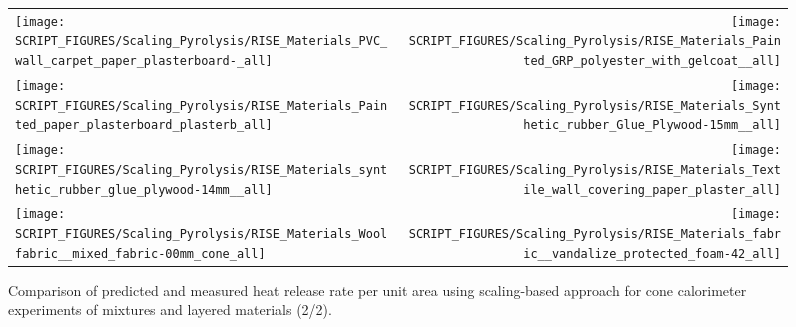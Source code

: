 \begin{figure}[!h]
\begin{tabular*}{\textwidth}{l@{\extracolsep{\fill}}r}
\texttt{[image: SCRIPT\_FIGURES/Scaling\_Pyrolysis/RISE\_Materials\_PVC\_wall\_carpet\_paper\_plasterboard-\_all]} &
\texttt{[image: SCRIPT\_FIGURES/Scaling\_Pyrolysis/RISE\_Materials\_Painted\_GRP\_polyester\_with\_gelcoat\_\_all]} \\
\texttt{[image: SCRIPT\_FIGURES/Scaling\_Pyrolysis/RISE\_Materials\_Painted\_paper\_plasterboard\_plasterb\_all]} &
\texttt{[image: SCRIPT\_FIGURES/Scaling\_Pyrolysis/RISE\_Materials\_Synthetic\_rubber\_Glue\_Plywood-15mm\_\_all]} \\
\texttt{[image: SCRIPT\_FIGURES/Scaling\_Pyrolysis/RISE\_Materials\_synthetic\_rubber\_glue\_plywood-14mm\_\_all]} &
\texttt{[image: SCRIPT\_FIGURES/Scaling\_Pyrolysis/RISE\_Materials\_Textile\_wall\_covering\_paper\_plaster\_all]} \\
\texttt{[image: SCRIPT\_FIGURES/Scaling\_Pyrolysis/RISE\_Materials\_Woolfabric\_\_mixed\_fabric-00mm\_cone\_all]} &
\texttt{[image: SCRIPT\_FIGURES/Scaling\_Pyrolysis/RISE\_Materials\_fabric\_\_vandalize\_protected\_foam-42\_all]} \\
\end{tabular*}
\caption[HRRPUA of RISE materials using scaling model, mixtures and layered materials]
{Comparison of predicted and measured heat release rate per unit area using scaling-based approach for cone calorimeter experiments of mixtures and layered materials (2/2).}
\label{RISE_Materials_mixtures2}
\end{figure}

\clearpage

